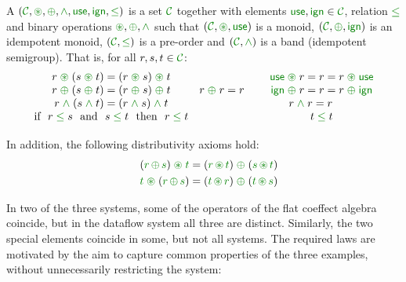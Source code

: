 \begin{definition}
A \emph{} $(\C, \cseq, \cpar, \czip, \cunit, \czero, \cleq)$ is a set
$\C$ together with elements $\cunit, \czero \in \C$, relation $\cleq$ and binary operations
$\cseq, \cpar, \czip$ such that $(\C, \cseq, \cunit)$ is a monoid, $(\C, \cpar, \czero)$ is an
idempotent monoid, $(\C, \cleq)$ is a pre-order and $(\C, \czip)$ is a band (idempotent semigroup).
That is, for all $r,s,t\in \C$:
%
\begin{equation*}
\begin{array}{ccc}
r \;\cseq\; (s \;\cseq\; t) = (r \;\cseq\; s) \;\cseq\; t &&
\cunit \;\cseq\; r = r = r \;\cseq\; \cunit
\\
r \;\cpar\; (s \;\cpar\; t) = (r \;\cpar\; s) \;\cpar\; t &
r\; \cpar\; r = r~~~~&
\czero \;\cpar\; r = r = r \;\cpar\; \czero
\\
r \;\czip\; (s \;\czip\; t) = (r \;\czip\; s) \;\czip\; t &&
r\; \czip\; r = r \qquad
\\
\textnormal{if}~~r\; \cleq\; s ~~\textnormal{and}~~s\; \cleq\; t~~\textnormal{then}~~r\; \cleq\; t &&
t\; \cleq\; t \\[0.5em]
\end{array}
\end{equation*}
%
In addition, the following distributivity axioms hold:
\begin{align*}
\quad (\cclrd{r}\, \cpar\, \cclrd{s}) \;\cseq\; \cclrd{t} & = (\cclrd{r} \,\cseq\, \cclrd{t}) \;\cpar\; (\cclrd{s}\, \cseq\, \cclrd{t}) \\
\quad \cclrd{t} \;\cseq\; (\cclrd{r}\, \cpar\, \cclrd{s}) & = (\cclrd{t} \,\cseq\, \cclrd{r}) \;\cpar\; (\cclrd{t}\, \cseq\, \cclrd{s})
\end{align*}
\end{definition}

\noindent
In two of the three systems, some of the operators of the flat coeffect algebra coincide, but
in the dataflow system all three are distinct. Similarly, the two special elements
coincide in some, but not all systems. The required laws are motivated by the aim to capture
common properties of the three examples, without unnecessarily restricting the system:

